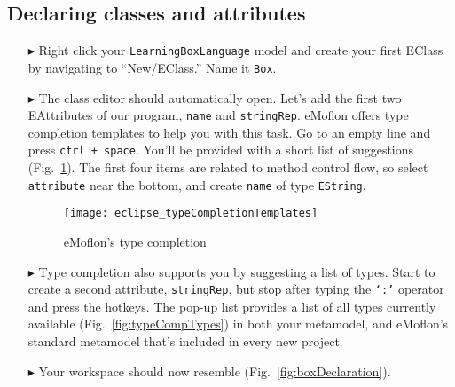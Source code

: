 \newpage
\hypertarget{static:classes tex}{}
\subsection{Declaring classes and attributes}
\texHeader

\begin{itemize}

\item[$\blacktriangleright$] Right click your \texttt{LearningBoxLanguage} model and create your first EClass by navigating to ``New/EClass.'' Name it
\texttt{Box}.

\vspace{0.5cm}

\item[$\blacktriangleright$] The class editor should automatically open. Let's add the first two EAttributes of our program, \texttt{name} and
\texttt{stringRep}. eMoflon offers type completion templates to help you with this task. Go to an empty line and press \texttt{ctrl + space}. You'll be provided
with a short list of suggestions (Fig.~\ref{fig:typeCompTempl}). The first four items are related to method control flow, so select \texttt{attribute} near
the bottom, and create \texttt{name} of type \texttt{EString}.

\vspace{0.5cm}

\begin{figure}[htbp]
	\centering
  \texttt{[image: eclipse\_typeCompletionTemplates]}
	\caption{eMoflon's type completion}
	\label{fig:typeCompTempl}
\end{figure} 

\vspace{0.5cm}

\item[$\blacktriangleright$] Type completion also supports you by suggesting a list of types. Start to create a second attribute, \texttt{stringRep}, but
stop after typing the \texttt{`:'} operator and press the hotkeys. The pop-up list provides a list of all types currently available (Fig.~\ref{fig:typeCompTypes}) in
both your metamodel, and eMoflon's standard metamodel that's included in every new project.

\vspace{0.5cm}

\item[$\blacktriangleright$] Your workspace should now resemble (Fig.~\ref{fig:boxDeclaration}).


\end{itemize}
